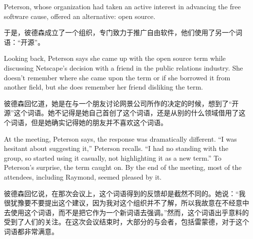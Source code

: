 
\ifdefined\eng
Peterson, whose organization had taken an active interest in advancing the free software cause, offered an alternative: open source.
\fi

\ifdefined\chs
于是，彼德森成立了一个组织，专门致力于推广自由软件，他们使用了另一个词语：``开源''。
\fi

\ifdefined\eng
Looking back, Peterson says she came up with the open source term while discussing Netscape's decision with a friend in the public relations industry. She doesn't remember where she came upon the term or if she borrowed it from another field, but she does remember her friend disliking the term.
\fi

\ifdefined\chs
彼德森回忆道，她是在与一个朋友讨论网景公司所作的决定的时候，想到了``开源''这个词语。她不记得是她自己首创了这个词语，还是从别的什么领域借用了这个词语，但是她确实记得她的朋友并不喜欢这个词语。
\fi

\ifdefined\eng
At the meeting, Peterson says, the response was dramatically different. ``I was hesitant about suggesting it,'' Peterson recalls. ``I had no standing with the group, so started using it casually, not highlighting it as a new term.'' To Peterson's surprise, the term caught on. By the end of the meeting, most of the attendees, including Raymond, seemed pleased by it.
\fi

\ifdefined\chs
彼德森回忆说，在那次会议上，这个词语得到的反馈却是截然不同的。她说：``我很犹豫要不要提出这个建议，因为我对这个组织并不了解，所以我故意在不经意中去使用这个词语，而不是把它作为一个新词语去强调。''然而，这个词语出乎意料的受到了人们的关注。在这次会议结束时，大部分的与会者，包括雷蒙德，对于这个词语都非常满意。
\fi

